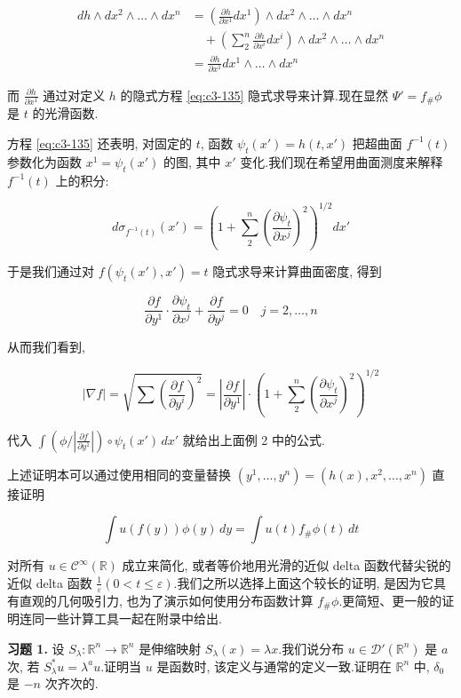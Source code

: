 \[
\begin{aligned}
dh\wedge dx^2\wedge\ldots\wedge dx^n &= \left(\frac{\partial h}{\partial x^1}dx^1\right)\wedge dx^2\wedge\ldots\wedge dx^n \\
&\quad + \left(\sum_{2}^n\frac{\partial h}{\partial x^i}dx^i\right)\wedge dx^2\wedge\ldots\wedge dx^n \\
&= \frac{\partial h}{\partial x^1}dx^1\wedge\ldots\wedge dx^n
\end{aligned}
\]

而 $\frac{\partial h}{\partial x^1}$ 通过对定义 $h$ 的隐式方程 \eqref{eq:c3-135} 隐式求导来计算.现在显然 $\Psi' = f_{\#}\phi$ 是 $t$ 的光滑函数.

方程 \eqref{eq:c3-135} 还表明, 对固定的 $t$, 函数 $\psi_t(x') = h(t, x')$ 把超曲面 $f^{-1}(t)$ 参数化为函数 $x^1 = \psi_t(x')$ 的图, 其中 $x'$ 变化.我们现在希望用曲面测度来解释 $f^{-1}(t)$ 上的积分:

\[
d\sigma_{f^{-1}(t)}(x') = \left(1+\sum_{2}^n\left(\frac{\partial\psi_t}{\partial x^j}\right)^2\right)^{1/2}dx'
\]

于是我们通过对 $f(\psi_t(x'), x') = t$ 隐式求导来计算曲面密度, 得到

\[
\frac{\partial f}{\partial y^1}\cdot\frac{\partial\psi_t}{\partial x^j} + \frac{\partial f}{\partial y^j} = 0 \quad j = 2, \ldots, n
\]

从而我们看到,

\[
|\nabla f| = \sqrt{\sum\left(\frac{\partial f}{\partial y^i}\right)^2} = \left|\frac{\partial f}{\partial y^1}\right|\cdot\left(1+\sum_{2}^n\left(\frac{\partial\psi_t}{\partial x^j}\right)^2\right)^{1/2}
\]

代入 $\int(\phi/|\frac{\partial f}{\partial y^1}|)\circ\psi_t(x')\, dx'$ 就给出上面例 2 中的公式.

上述证明本可以通过使用相同的变量替换 $(y^1, \ldots, y^n) = (h(x), x^2, \ldots, x^n)$ 直接证明

\[
\int u(f(y))\phi(y)\, dy = \int u(t)f_{\#}\phi(t)\, dt
\]

对所有 $u\in\mathcal{C}^{\infty}(\mathbb{R})$ 成立来简化, 或者等价地用光滑的近似 delta 函数代替尖锐的近似 delta 函数 $\frac{1}{\varepsilon}(0<t\leq\varepsilon)$.我们之所以选择上面这个较长的证明, 是因为它具有直观的几何吸引力, 也为了演示如何使用分布函数计算 $f_{\#}\phi$.更简短、更一般的证明连同一些计算工具一起在附录中给出.

\textbf{习题 1.} 设 $S_{\lambda} : \mathbb{R}^n\to\mathbb{R}^n$ 是伸缩映射 $S_{\lambda}(x) = \lambda x$.我们说分布 $u\in\mathcal{D}'(\mathbb{R}^n)$ 是 $a$ 次, 若 $S_{\lambda}^*u = \lambda^a u$.证明当 $u$ 是函数时, 该定义与通常的定义一致.证明在 $\mathbb{R}^n$ 中, $\delta_0$ 是 $-n$ 次齐次的.

